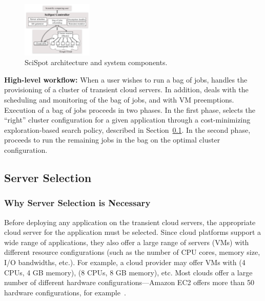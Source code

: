 \begin{figure}[t]
  \includegraphics[width=0.3\textwidth]{../figures/Architecture.png}
\vspace*{\myfigspace}
  \caption{SciSpot architecture and system components.}
  \label{fig:arch}
  \vspace*{\myfigspace}
\end{figure}


\noindent \textbf{High-level workflow:} When a user wishes to run a bag of jobs, \sysname handles the provisioning of a cluster of transient cloud servers.
In addition, \sysname deals with the scheduling and monitoring of the bag of jobs, and with VM preemptions. 
Execution of a bag of jobs proceeds in two phases.
In the first phase, \sysname selects the ``right'' cluster configuration for a given application through a cost-minimizing exploration-based search policy, described in Section~\ref{subsec:server-selection}. 
In the second phase, \sysname proceeds to run the remaining jobs in the bag on the optimal cluster configuration. 

\subsection{Server Selection}
\label{subsec:server-selection}

\subsubsection{Why Server Selection is Necessary}

Before deploying any application on the transient cloud servers, the appropriate cloud server for the application must be selected. 
Since cloud platforms support a wide range of applications, they also offer a large range of servers (VMs) with different resource configurations (such as the number of CPU cores, memory size, I/O bandwidths, etc.). 
For example, a cloud provider may offer VMs with (4 CPUs, 4 GB memory), (8 CPUs, 8 GB memory), etc.
Most clouds offer a large number of different hardware configurations---Amazon EC2 offers more than 50 hardware configurations, for example~\cite{amazon-ec2-instance-types}. 


